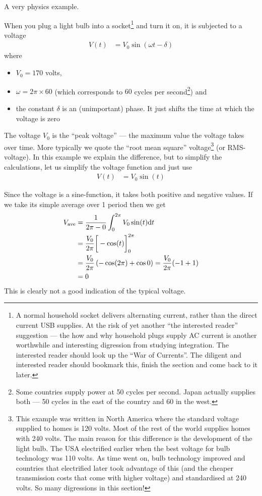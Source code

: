 A very physics example.
\begin{eg}
\label{eg:peakvsrms}When you plug a light bulb into a socket\footnote{A normal household socket delivers
alternating current, rather than the direct current USB supplies. At the risk of yet
another ``the interested reader'' suggestion --- the how and why household plugs supply
AC current is another worthwhile and interesting digression from studying integration.
The interested reader should look up the ``War of Currents''. The diligent and
interested reader should bookmark this, finish the section and come back to it later.}
and turn it on, it is subjected to a voltage
\begin{align*}
 V(t) &= V_0\sin(\omega t-\delta)
\end{align*}
where
\begin{itemize}
\item $V_0=170$ volts,
\item $\omega=2\pi\times 60$ (which corresponds to $60$ cycles per second\footnote{Some
countries supply power at 50 cycles per second. Japan actually supplies both --- 50
cycles in the east of the country and 60 in the west.})
and
\item the constant $\delta$ is an (unimportant) phase. It just shifts the time
at which the voltage is zero
\end{itemize}
The voltage $V_0$ is the ``peak voltage'' --- the maximum value the voltage takes over
time. More typically we quote the ``root mean square'' voltage\footnote{This example was
written in North America where the standard voltage supplied to homes is 120 volts. Most
of the rest of the world supplies homes with 240 volts. The main reason for this
difference is the development of the light bulb. The USA electrified earlier when the best
voltage for bulb technology was 110 volts. As time went on, bulb technology improved and
countries that electrified later took advantage of this (and the cheaper transmission
costs that come with higher voltage) and standardised at 240 volts. So many digressions in
this section!}  (or RMS-voltage). In this example we explain the difference, but to
simplify the calculations, let us simplify the voltage function and just use
\begin{align*}
  V(t) &= V_0 \sin(t)
\end{align*}

Since the voltage is a sine-function, it takes both positive and negative values. If we
take its simple average over 1 period then we get
\begin{align*}
  V_{\mathrm{ave}} &= \frac{1}{2\pi-0} \int_0^{2\pi} V_0 \sin(t) \mathrm{d}t\\
  &= \frac{V_0}{2\pi}\bigg[ - \cos(t)\bigg]_0^{2\pi} \\
  &= \frac{V_0}{2\pi}\left( -\cos(2\pi) + \cos 0\right) = \frac{V_0}{2\pi}(-1+1)\\
  &= 0
\end{align*}
This is clearly not a good indication of the typical voltage.


\end{eg}
